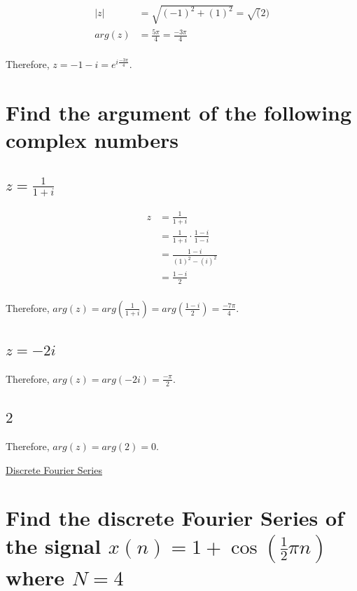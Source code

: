 \documentclass{article}
\renewcommand{\thesubsection}{\thesection.\alph{subsection}}
\begin{document}
\begin{align*}
	|z| &= \sqrt{(-1)^2 + (1)^2} = \sqrt(2) \\
	arg(z) &= \frac{5\pi}{4} = \frac{-3\pi}{4} \\
\end{align*}

Therefore, $z = - 1 - i = e^{i\frac{-3\pi}{4}}$.

\section[Question ~\thesection]{Find the argument of the following complex numbers}

\subsection[~\thesubsection]{$z = \frac{1}{1 + i}$}

\begin{align*}
	z &= \frac{1}{1 + i} \\
	&= \frac{1}{1 + i} \cdot \frac{1 - i}{1 - i} \\
	&= \frac{1 - i}{(1)^2 - (i)^2} \\
	&= \frac{1 - i}{2} \\
\end{align*}

Therefore, $arg(z) = arg(\frac{1}{1 + i}) = arg(\frac{1 - i}{2}) = \frac{-7\pi}{4}$.

\subsection[~\thesubsection]{$z = -2i$}

Therefore, $arg(z) = arg(-2i) = \frac{-\pi}{2}$.

\subsection[~\thesubsection]{$2$}

Therefore, $arg(z) = arg(2) = 0$.

\newpage

\begin{center}
	\Large{\underline{Discrete Fourier Series}}
\end{center}

\section[Question ~\thesection]{Find the discrete Fourier Series of the signal $x(n) = 1 + \cos{(\frac{1}{2}{\pi}n)}$ where $N = 4$}
\end{document}
